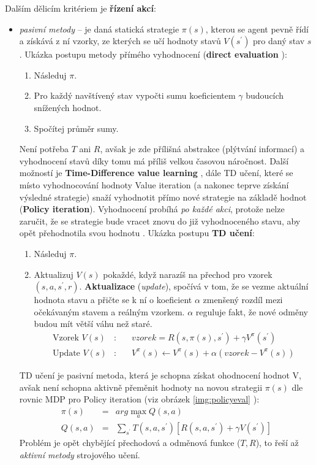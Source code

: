 Dalším dělicím kritériem je \textbf{řízení akcí}:
\begin{itemize}
  \item \textit{pasivní metody} -- je daná statická strategie $\pi(s)$, kterou se agent pevně řídí a získává z ní vzorky, ze kterých se učí hodnoty stavů $V(s^\prime)$ pro daný stav $s$.
  \newline
  Ukázka postupu metody přímého vyhodnocení (\textbf{direct evaluation} \cite{berkeley}):
  \begin{enumerate}
    \item Následuj $\pi$.
    \item Pro každý navštívený stav vypočti sumu koeficientem $\gamma$ budoucích snížených hodnot.
    \item Spočítej průměr sumy.
  \end{enumerate}
  Není potřeba $T$ ani $R$, avšak je zde přílišná abstrakce (plýtvání informací) a vyhodnocení stavů díky tomu má příliš velkou časovou náročnost.
  \newline
  Další možností je \textbf{Time-Difference value learning} \cite{RLIntro}, dále TD učení, které se místo vyhodnocování hodnoty Value iteration (a nakonec teprve získání výsledné strategie) snaží vyhodnotit přímo nové strategie na základě hodnot (\textbf{Policy iteration}). Vyhodnocení probíhá \textit{po každé akci}, protože nelze zaručit, že se strategie bude vracet znovu do již vyhodnoceného stavu, aby opět přehodnotila svou hodnotu \cite{RLpaper}.
  \newline
  Ukázka postupu \textbf{TD učení}:
  \begin{enumerate}
    \item Následuj $\pi$.
    \item Aktualizuj $V(s)$ pokaždé, když narazíš na přechod pro vzorek $(s,a,s^\prime,r)$. \textbf{Aktualizace} (\textit{update}), spočívá v tom, že se vezme aktuální hodnota stavu a přičte se k ní o koeficient $\alpha$ zmenšený rozdíl mezi očekávaným stavem a reálným vzorkem. $\alpha$ reguluje fakt, že nové odměny budou mít větší váhu než staré.
    \begin{eqnarray}
    \textrm{Vzorek $V(s)$} &\textrm{:}& \quad vzorek = R(s,\pi(s),s^\prime)+\gamma V^\pi(s^\prime) \\
    \textrm{Update $V(s)$} &\textrm{:}& \quad V^\pi(s) \leftarrow  V^\pi(s) + \alpha(vzorek - V^\pi(s))
    \end{eqnarray}
  \end{enumerate}
  TD učení je pasivní metoda, která je schopna získat ohodnocení hodnot V, avšak není schopna aktivně přeměnit hodnoty na novou strategii $\pi(s)$ dle rovnic MDP pro Policy iteration (viz obrázek \ref{img:policyeval} \cite{berkeley}):
  \begin{eqnarray}
  \pi(s) &=& arg \max_a Q(s,a) \\
  Q(s,a) &=& \sum_{s^\prime}T(s,a,s^\prime) \left[R(s,a,s^\prime)+\gamma V(s^\prime) \right]
  \end{eqnarray}
  Problém je opět chybějící přechodová a odměnová funkce ($T,R$), to řeší až \textit{aktivní metody} strojového učení.


\end{itemize}
